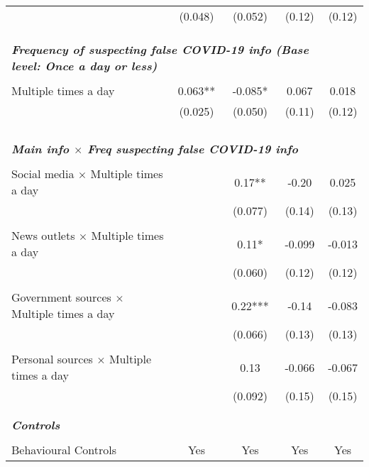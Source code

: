 \documentclass{article}[12pt]
\begin{document}
\begin{table}[h!]
{\begin{tabular}{lcccc}
                     & (0.048) & (0.052) & (0.12) & (0.12) \\
                     \\\\\\
                    \multicolumn{4}{l}{\bf \textit{Frequency of suspecting false COVID-19 info (Base level: Once a day or less)}} \\
                     \\
                    Multiple times a day & 0.063** & -0.085* & 0.067 & 0.018 \\
                     & (0.025) & (0.050) & (0.11) & (0.12) \\
                     \\\\\\
                     \\
                    \multicolumn{5}{l}{\bf \textit{Main info $\times$ Freq suspecting false COVID-19 info}} \\
                     \\
                    Social media $\times$ Multiple times a day &  & 0.17** & -0.20 & 0.025 \\
                     &  & (0.077) & (0.14) & (0.13) \\
                     \\
                    News outlets $\times$ Multiple times a day &  & 0.11* & -0.099 & -0.013 \\
                     &  & (0.060) & (0.12) & (0.12) \\
                     \\
                    Government sources $\times$ Multiple times a day &  & 0.22*** & -0.14 & -0.083 \\
                     &  & (0.066) & (0.13) & (0.13) \\
                     \\
                    Personal sources $\times$ Multiple times a day &  & 0.13 & -0.066 & -0.067 \\
                     &  & (0.092) & (0.15) & (0.15) \\
                     \\\\
                    \textbf{\textit{Controls}} \\
                     \\
                    Behavioural Controls & Yes & Yes & Yes & Yes\\

\end{tabular}}
\end{table}
\end{document}
